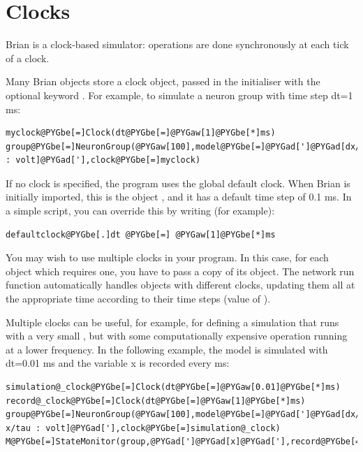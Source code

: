 \documentclass[letterpaper,10pt,english]{manual}
\begin{document}
\resetcurrentobjects
{}

\hypertarget{index-2}{}\section{Clocks}

Brian is a clock-based simulator: operations are done synchronously at each tick of a clock.

Many Brian objects store a clock object, passed in the initialiser with the optional keyword .
For example, to simulate a neuron group with time step dt=1 ms:

\begin{Verbatim}[commandchars=@\[\]]
myclock@PYGbe[=]Clock(dt@PYGbe[=]@PYGaw[1]@PYGbe[*]ms)
group@PYGbe[=]NeuronGroup(@PYGaw[100],model@PYGbe[=]@PYGad[']@PYGad[dx/dt=1*mV/ms : volt]@PYGad['],clock@PYGbe[=]myclock)
\end{Verbatim}

If no clock is specified, the program uses the global default clock. When Brian is initially
imported, this is the object \hyperlink{brian.defaultclock}{}, and it has a default
time step of 0.1 ms. In a simple script, you can override this by writing (for example):

\begin{Verbatim}[commandchars=@\[\]]
defaultclock@PYGbe[.]dt @PYGbe[=] @PYGaw[1]@PYGbe[*]ms
\end{Verbatim}

You may wish to use multiple clocks in your program. In this case,
for each object which requires one, you have to pass a copy of its
\hyperlink{brian.Clock}{} object. The network run function automatically handles objects
with different clocks, updating them all at the appropriate time
according to their time steps (value of \hyperlink{brian.Clock.dt}{}).

Multiple clocks can be useful, for example, for defining a simulation
that runs with a very small , but with some computationally
expensive operation running at a lower frequency. In the following example, the model
is simulated with dt=0.01 ms and the variable x is recorded every ms:

\begin{Verbatim}[commandchars=@\[\]]
simulation@_clock@PYGbe[=]Clock(dt@PYGbe[=]@PYGaw[0.01]@PYGbe[*]ms)
record@_clock@PYGbe[=]Clock(dt@PYGbe[=]@PYGaw[1]@PYGbe[*]ms)
group@PYGbe[=]NeuronGroup(@PYGaw[100],model@PYGbe[=]@PYGad[']@PYGad[dx/dt=-x/tau : volt]@PYGad['],clock@PYGbe[=]simulation@_clock)
M@PYGbe[=]StateMonitor(group,@PYGad[']@PYGad[x]@PYGad['],record@PYGbe[=]@PYGad[']@PYGad[True]@PYGad['],clock@PYGbe[=]record@_clock)
\end{Verbatim}
\end{document}

